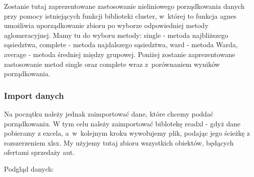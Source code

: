 \documentclass[12pt,a4paper]{report}
\begin{document}
{%


Zostanie tutaj zaprezentowane zastosowanie nieliniowego porządkowania
danych przy pomocy istniejących funkcji biblioteki cluster, w~której to
funkcja agnes umożliwia uporządkowanie zbioru po wyborze
odpowiedniej metody aglomeracyjnej. Mamy tu do wyboru metody: single -
metoda najbliższego sąsiedztwa, complete - metoda najdalszego
sąsiedztwa, ward - metoda Warda, average - metoda średniej między
grupowej. Poniżej zostanie zaprezentowane zastosowanie metod single oraz
complete wraz z~porównaniem wyników porządkowania.

\subsubsection{Import danych}

Na początku należy jednak zaimportować dane, które chcemy poddać porządkowaniu.
W tym celu należy zaimportować biblotekę readxl - gdyż dane pobieramy z
excela, a~w~kolejnym kroku wywołujemy plik, podając jego ścieżkę 
z rozszerzeniem xlsx. My użyjemy tutaj zbioru wszystkich obiektów,
będących ofertami sprzedaży aut.

\begin{Shaded}
\begin{Highlighting}[]
\StringTok{ }\NormalTok{(}\NormalTok{, }
                            \NormalTok{)}
\end{Highlighting}
\end{Shaded}

Podgląd danych:

\begin{Shaded}
\begin{Highlighting}[]
\end{Highlighting}
\end{Shaded}

}
\end{document}

